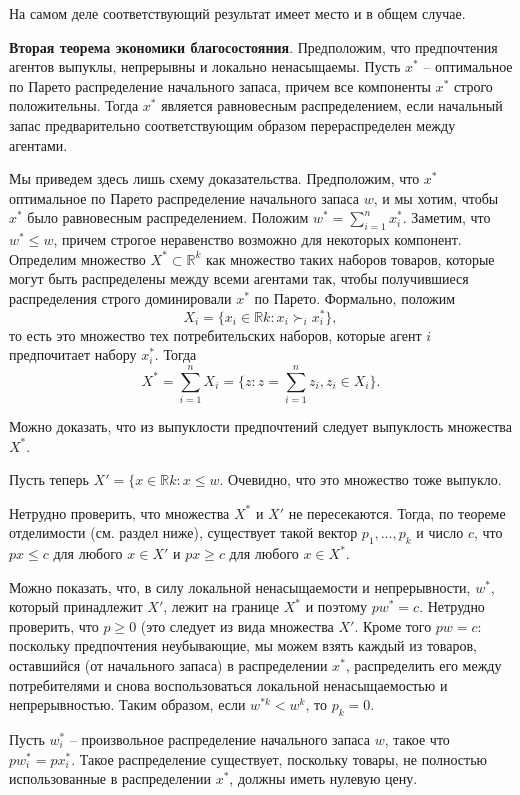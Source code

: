 На самом деле соответствующий результат имеет место и в общем случае.

{\bf Вторая теорема экономики благосостояния}. Предположим, что предпочтения агентов
выпуклы, непрерывны и локально ненасыщаемы. Пусть $x^*$ -- оптимальное по Парето
распределение начального запаса, причем все компоненты $x^*$ строго положительны.
Тогда $x^*$ является равновесным распределением, если начальный запас предварительно
соответствующим образом перераспределен между агентами.

Мы приведем здесь лишь схему доказательства. Предположим, что $x^*$ оптимальное по Парето
распределение начального запаса $w$, и мы хотим, чтобы $x^*$ было равновесным распределением.
Положим $w^*=\sum^n_{i=1}x^*_i$. Заметим, что $w^*\leq w$, причем строгое неравенство возможно
для некоторых компонент.
Определим множество $X^*\subset\mathbb{R}^{k}$ как множество таких наборов товаров, которые
могут быть распределены между всеми агентами так, чтобы получившиеся распределения
строго доминировали $x^*$ по Парето. Формально, положим
$$X_i=\{x_i\in\mathbb{R}{k}: x_i\succ_ix^*_i\},$$
то есть это множество тех потребительских наборов, которые агент $i$ предпочитает
набору $x^*_i$. Тогда
$$X^*=\sum^n_{i=1}X_i=\{z: z=\sum^n_{i=1}z_i, z_i\in X_i\}.$$

Можно доказать, что из выпуклости предпочтений
следует выпуклость множества $X^*$.

Пусть теперь $X\prime=\{x\in\mathbb{R}{k}: x\leq w$. Очевидно, что это множество тоже выпукло.

Нетрудно проверить, что множества $X^*$ и $X\prime$ не пересекаются. Тогда, по теореме отделимости
(см. раздел        ниже), существует такой вектор $p_1, \ldots , p_k$ и число $c$, что
$px\leq c$ для любого $x\in X\prime$ и $px\geq c$ для любого $x\in X^*$.

Можно показать, что, в силу локальной ненасыщаемости и непрерывности, $w^*$, который принадлежит
$X\prime$, лежит на границе $X^*$ и поэтому $pw^*=c$. Нетрудно проверить, что $p\geq0$ (это следует
из вида множества $X\prime$. Кроме того $pw=c$: поскольку предпочтения неубывающие, мы можем
взять каждый из товаров, оставшийся (от начального запаса) в распределении $x^*$, распределить
его между потребителями и снова воспользоваться локальной ненасыщаемостью и непрерывностью.
Таким образом, если $w^{*k}<w^k$, то $p_k=0$.

Пусть $w^*_i$ -- произвольное распределение начального запаса $w$, такое что
$pw^*_i=px^*_i$. Такое распределение существует, поскольку товары, не полностью
использованные в распределении $x^*$, должны иметь нулевую цену.

